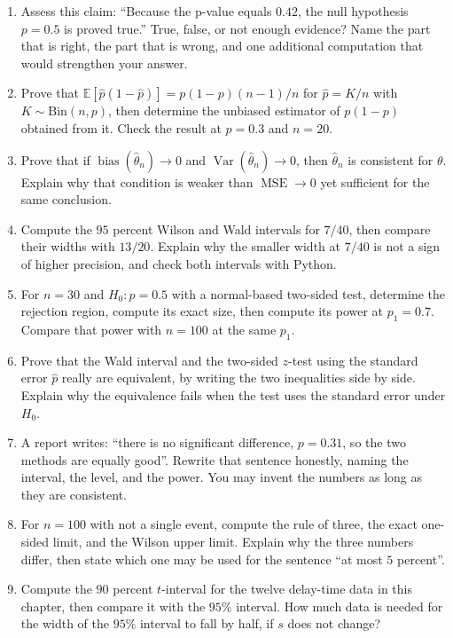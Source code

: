 \begin{latihan}
\begin{enumerate}
  \item Assess this claim: ``Because the p-value equals $0.42$, the null hypothesis
        $p=0.5$ is proved true.'' True, false, or not enough evidence? Name
        the part that is right, the part that is wrong, and one additional computation that
        would strengthen your answer.
  \item Prove that $\mathbb{E}[\hat p(1-\hat p)]=p(1-p)(n-1)/n$ for
        $\hat p=K/n$ with $K\sim\mathrm{Bin}(n,p)$, then determine the unbiased estimator
        of $p(1-p)$ obtained from it. Check the result at $p=0.3$ and
        $n=20$.
  \item Prove that if $\operatorname{bias}(\hat\theta_n)\to0$ and
        $\operatorname{Var}(\hat\theta_n)\to0$, then $\hat\theta_n$ is consistent for
        $\theta$. Explain why that condition is weaker than
        $\operatorname{MSE}\to0$ yet sufficient for the same conclusion.
  \item Compute the $95$ percent Wilson and Wald intervals for $7/40$, then compare
        their widths with $13/20$. Explain why the smaller width at $7/40$
        is not a sign of higher precision, and check both intervals with
        Python.
  \item For $n=30$ and $H_0\colon p=0.5$ with a normal-based two-sided test,
        determine the rejection region, compute its exact size, then compute its power at
        $p_1=0.7$. Compare that power with $n=100$ at the same
        $p_1$.
  \item Prove that the Wald interval and the two-sided $z$-test using the standard error
        $\hat p$ really are equivalent, by writing the two inequalities side by side.
        Explain why the equivalence fails when the test uses the standard error under
        $H_0$.
  \item A report writes: ``there is no significant difference, $p=0.31$,
        so the two methods are equally good''. Rewrite that sentence honestly, naming the
        interval, the level, and the power. You may invent the numbers as long as they are
        consistent.
  \item For $n=100$ with not a single event, compute the rule of three, the exact one-sided
        limit, and the Wilson upper limit. Explain why the three numbers differ, then
        state which one may be used for the sentence ``at most $5$ percent''.
  \item Compute the $90$ percent $t$-interval for the twelve delay-time data in this chapter,
        then compare it with the $95\%$ interval. How much data is needed for the width
        of the $95\%$ interval to fall by half, if $s$ does not change?
\end{enumerate}


\end{latihan}
